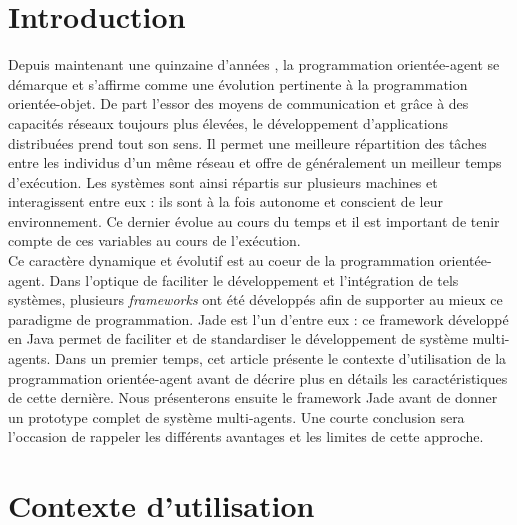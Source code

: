 \documentclass[conference]{IEEEtran}
\begin{document}
%
\IEEEpeerreviewmaketitle

\section{Introduction}

Depuis maintenant une quinzaine d'années \cite{garneau}, la programmation orientée-agent se démarque et s'affirme comme une évolution pertinente à la programmation orientée-objet. De part l'essor des moyens de communication et grâce à des capacités réseaux toujours plus élevées, le développement d'applications distribuées prend tout son sens. Il permet une meilleure répartition des tâches entre les individus d'un même réseau et offre de généralement un meilleur temps d'exécution. Les systèmes sont ainsi répartis sur plusieurs machines et interagissent entre eux : ils sont à la fois autonome et conscient de leur environnement. Ce dernier évolue au cours du temps et il est important de tenir compte de ces variables au cours de l'exécution.\\

Ce caractère dynamique et évolutif est au coeur de la programmation orientée-agent. Dans l'optique de faciliter le développement et l'intégration de tels systèmes, plusieurs \textit{frameworks} ont été développés afin de supporter au mieux ce paradigme de programmation. Jade est l'un d'entre eux : ce framework développé en Java permet de faciliter et de standardiser le développement de système multi-agents. Dans un premier temps, cet article présente le contexte d'utilisation de la programmation orientée-agent avant de décrire plus en détails les caractéristiques de cette dernière. Nous présenterons ensuite le framework Jade avant de donner un prototype complet de système multi-agents. Une courte conclusion sera l'occasion de rappeler les différents avantages et les limites de cette approche.\\

\section{Contexte d'utilisation}
\end{document}
